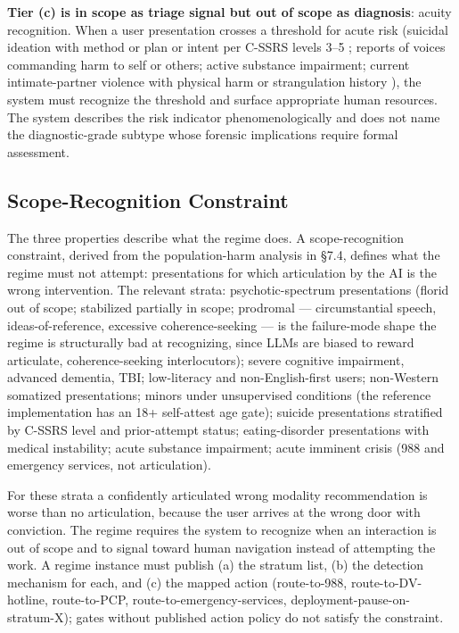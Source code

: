 \documentclass[letterpaper]{article}
\begin{document}
\textbf{Tier (c) is in scope as triage signal but out of scope as diagnosis}: acuity recognition. When a user presentation crosses a threshold for acute risk (suicidal ideation with method or plan or intent per C-SSRS levels 3--5 \citep{posner2011cssrs}; reports of voices commanding harm to self or others; active substance impairment; current intimate-partner violence with physical harm or strangulation history \citep{glass2008strangulation}), the system must recognize the threshold and surface appropriate human resources. The system describes the risk indicator phenomenologically and does not name the diagnostic-grade subtype whose forensic implications require formal assessment.

\subsection{Scope-Recognition Constraint}

The three properties describe what the regime does. A scope-recognition constraint, derived from the population-harm analysis in \S7.4, defines what the regime must not attempt: presentations for which articulation by the AI is the wrong intervention. The relevant strata: psychotic-spectrum presentations (florid out of scope; stabilized partially in scope; prodromal --- circumstantial speech, ideas-of-reference, excessive coherence-seeking --- is the failure-mode shape the regime is structurally bad at recognizing, since LLMs are biased to reward articulate, coherence-seeking interlocutors); severe cognitive impairment, advanced dementia, TBI; low-literacy and non-English-first users; non-Western somatized presentations; minors under unsupervised conditions (the reference implementation has an 18+ self-attest age gate); suicide presentations stratified by C-SSRS level and prior-attempt status; eating-disorder presentations with medical instability; acute substance impairment; acute imminent crisis (988 and emergency services, not articulation).

For these strata a confidently articulated wrong modality recommendation is worse than no articulation, because the user arrives at the wrong door with conviction. The regime requires the system to recognize when an interaction is out of scope and to signal toward human navigation instead of attempting the work. A regime instance must publish (a) the stratum list, (b) the detection mechanism for each, and (c) the mapped action (route-to-988, route-to-DV-hotline, route-to-PCP, route-to-emergency-services, deployment-pause-on-stratum-X); gates without published action policy do not satisfy the constraint.
\end{document}
